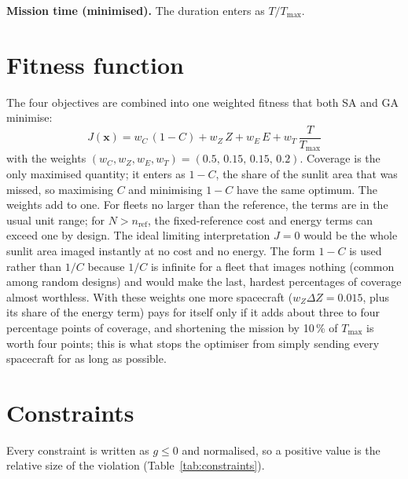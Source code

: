 \textbf{Mission time (minimised).} The duration enters as $T/T_{\max}$.

\section{Fitness function}
The four objectives are combined into one weighted fitness that both \ac{SA} and \ac{GA} minimise:
\begin{equation}
\boxed{\;J(\mathbf{x})=w_C\,(1-C)+w_Z\,Z+w_E\,E+w_T\,\frac{T}{T_{\max}}\;}
\label{eq:J}
\end{equation}
with the weights $(w_C,w_Z,w_E,w_T)=(0.5,\,0.15,\,0.15,\,0.2)$.
Coverage is the only maximised quantity; it enters as $1-C$, the share of the sunlit area that
was missed, so maximising $C$ and minimising $1-C$ have the same optimum. The weights add to one.
For fleets no larger than the reference, the terms are in the usual unit range; for
$N>n_{\mathrm{ref}}$, the fixed-reference cost and energy terms can exceed one by design. The ideal
limiting interpretation $J=0$ would be the whole sunlit area imaged instantly at no cost and no
energy. The form $1-C$ is used rather than $1/C$ because $1/C$ is
infinite for a fleet that images nothing (common among random designs) and would make the last,
hardest percentages of coverage almost worthless. With these weights one more spacecraft
($w_Z\Delta Z=0.015$, plus its share of the energy term) pays for itself only if it adds about
three to four percentage points of coverage, and
shortening the mission by 10\,\% of $T_{\max}$ is worth four points; this is what stops the
optimiser from simply sending every spacecraft for as long as possible.

\section{Constraints}
\label{sec:constraints}
Every constraint is written as $g\le0$ and normalised, so a positive value is the relative size
of the violation (Table~\ref{tab:constraints}).

